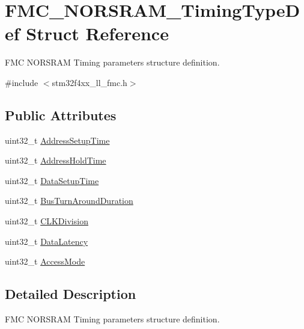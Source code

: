 \hypertarget{struct_f_m_c___n_o_r_s_r_a_m___timing_type_def}{}\section{F\+M\+C\+\_\+\+N\+O\+R\+S\+R\+A\+M\+\_\+\+Timing\+Type\+Def Struct Reference}
\label{struct_f_m_c___n_o_r_s_r_a_m___timing_type_def}


F\+MC N\+O\+R\+S\+R\+AM Timing parameters structure definition.  




{\ttfamily \#include $<$stm32f4xx\+\_\+ll\+\_\+fmc.\+h$>$}

\subsection*{Public Attributes}
\begin{DoxyCompactItemize}
\item 
uint32\+\_\+t \hyperlink{struct_f_m_c___n_o_r_s_r_a_m___timing_type_def_a3a22f760a9ddd85f0e256efa6d8ff8dd}{Address\+Setup\+Time}
\item 
uint32\+\_\+t \hyperlink{struct_f_m_c___n_o_r_s_r_a_m___timing_type_def_a93fe36daa1ceddc36ea168542dcdd010}{Address\+Hold\+Time}
\item 
uint32\+\_\+t \hyperlink{struct_f_m_c___n_o_r_s_r_a_m___timing_type_def_a6d98531021e36edf901d6cb01d6adaaa}{Data\+Setup\+Time}
\item 
uint32\+\_\+t \hyperlink{struct_f_m_c___n_o_r_s_r_a_m___timing_type_def_a430810aecc228ce17dd109c7a709da58}{Bus\+Turn\+Around\+Duration}
\item 
uint32\+\_\+t \hyperlink{struct_f_m_c___n_o_r_s_r_a_m___timing_type_def_a093fa589f174cde14dbc2c6caeee08ff}{C\+L\+K\+Division}
\item 
uint32\+\_\+t \hyperlink{struct_f_m_c___n_o_r_s_r_a_m___timing_type_def_ad747ab03382954e5b7db99c1448f8a88}{Data\+Latency}
\item 
uint32\+\_\+t \hyperlink{struct_f_m_c___n_o_r_s_r_a_m___timing_type_def_a749d0d44b1fd4e711b0a6897edc3ccfc}{Access\+Mode}
\end{DoxyCompactItemize}


\subsection{Detailed Description}
F\+MC N\+O\+R\+S\+R\+AM Timing parameters structure definition. 

